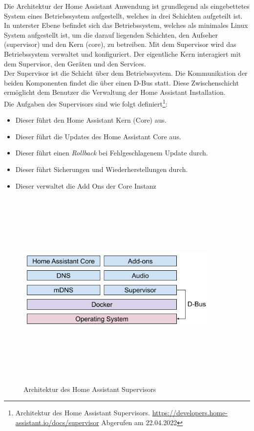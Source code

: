     Die Architektur der Home Assistant Anwendung ist grundlegend als eingebettetes System eines Betriebssystem aufgestellt, welches in 
    drei Schichten aufgeteilt ist. In unterster Ebene befindet sich das Betriebssystem, welches als minimales Linux System aufgestellt 
    ist, um die darauf liegenden Schichten, den Aufseher (supervisor) und den Kern (core), zu betreiben. Mit dem Supervisor wird das 
    Betriebssystem verwaltet und konfiguriert. Der eigentliche Kern interagiert mit dem Supervisor, den Geräten und den Services. 
    \\
    \linebreak
    Der Supervisor ist die Schicht über dem Betriebssystem. Die Kommunikation der beiden Komponenten findet die über einen D-Bus statt. Diese Zwischenschicht ermöglicht dem 
    Benutzer die Verwaltung der Home Assistant Installation. 
    \\
    Die Aufgaben des Supervisors sind wie folgt 
    definiert\footnote{Architektur des Home Assistant Supervisors. \url{https://developers.home-assistant.io/docs/supervisor} Abgerufen am 22.04.2022}: 
    \begin{itemize}
        \item Dieser führt den Home Assistant Kern (Core) aus.
        \item Dieser führt die Updates des Home Assistant Core aus.
        \item Dieser führt einen \textit{Rollback} bei Fehlgeschlagenem Update durch.
        \item Dieser führt Sicherungen und Wiederherstellungen durch.
        \item Dieser verwaltet die Add Ons der Core Instanz
    \end{itemize}
    \begin{figure}[hbt!]
        \centering
        \includegraphics[width=10cm,height=10cm,keepaspectratio]{images/ha_architecture_2020.png}
        \caption{Architektur des Home Assistant Supervisors}
        \label{fig:architectureHAOS}
    \end{figure}
